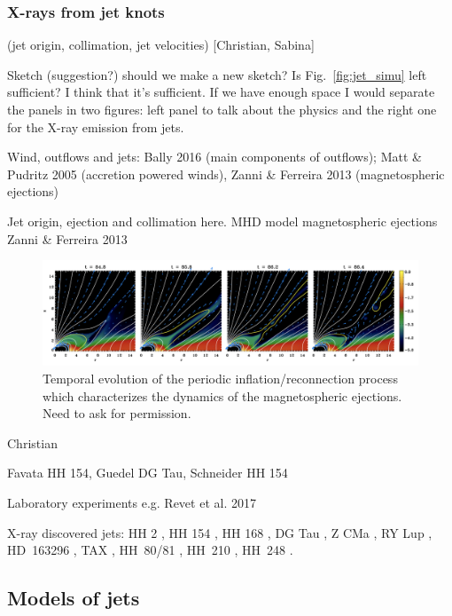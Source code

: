 \subsubsection{X-rays from jet knots}

{\color{blue}(jet origin, collimation, jet velocities) [Christian, Sabina]}


Sketch (suggestion?) should we make a new sketch? Is Fig.~\ref{fig:jet_simu} left sufficient?
I think that it's sufficient. If we have enough space I would separate the panels in two figures: left panel to talk about the physics and the right one for the X-ray emission from jets.

Wind, outflows and jets: Bally 2016 (main components of outflows); Matt \& Pudritz 2005 (accretion powered winds), Zanni \& Ferreira 2013 (magnetospheric ejections)

Jet origin, ejection and collimation here.
MHD model magnetospheric ejections Zanni \& Ferreira 2013

\begin{figure}
    \centering
    \includegraphics[width=12cm]{figs/Zanni2013.png}
    \caption{Temporal evolution of the periodic inflation/reconnection process which characterizes the dynamics of the magnetospheric ejections. Need to ask for permission.}
    \label{fig:zanni2013}
\end{figure}

{\color{blue}Christian

Favata HH 154, Guedel DG Tau, Schneider HH 154

Laboratory experiments  e.g. Revet et al. 2017
}

X-ray discovered jets: HH 2 \citep{Pravdo_2001,Schneider_2012}, HH 154 \citep{Favata_2002,Bally_2003,Favata_2006,Schneider_2011}, HH 168 \citep{Pravdo_2005,Schneider_2009}, DG Tau \citep{Guedel_2005,Guedel_2008,Schneider_2008}, Z CMa \citep{Stelzer_2009}, RY Lup \citep{Skinner_2011}, HD~163296 \citep{Swartz_2005,Guenther_2013}, TAX \citep{Guedel_2007}, HH~80/81 \citep{Pravdo_2004}, HH~210 \citep{Grosso_2006}, HH~248 \citep{Lopez_2015}.

\subsection{Models of jets}

